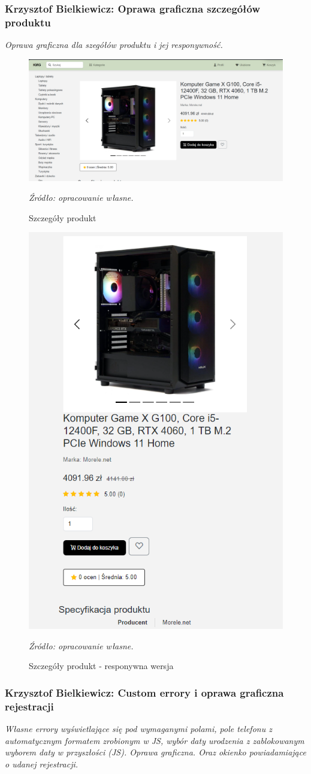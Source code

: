 \documentclass[12pt,a4paper,oneside]{article}
\theoremstyle{definition}
\numberwithin{equation}{section}
\begin{document}
\subsubsection{Krzysztof Bielkiewicz: Oprawa graficzna szczegółów produktu}
\label{1.3.16}
\textit{Oprawa graficzna dla szegółów produktu i jej responywność.}
\begin{figure}[H]
    \centering
    \includegraphics[width=1.0\columnwidth]{images/krzysztofBImages/product-detail.png}
    \caption{Szczegóły produkt}
    \emph{Źródło: opracowanie własne.}
\end{figure}
\begin{figure}[H]
    \centering
    \includegraphics[width=0.5\columnwidth]{images/krzysztofBImages/product-detail-respo.png}
    \caption{Szczegóły produkt - responywna wersja}
    \emph{Źródło: opracowanie własne.}
\end{figure}

\subsubsection{Krzysztof Bielkiewicz: Custom errory i oprawa graficzna rejestracji}
\label{1.3.17}
\textit{Własne errory wyświetlające się pod wymaganymi polami,
pole telefonu z automatycznym formatem zrobionym w JS,
 wybór daty urodzenia z zablokowanym wyborem daty w przyszłości (JS). Oprawa graficzna.
 Oraz okienko powiadamiające o udanej rejestracji.}
\end{document}
